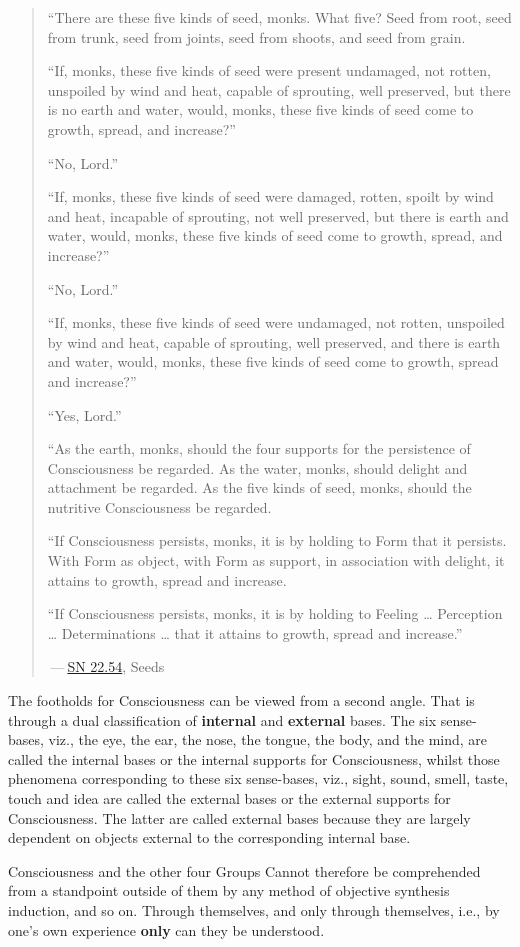 \begin{quote}
``There are these five kinds of seed, monks. What five? Seed from root, seed from trunk, seed from joints, seed from shoots, and seed from grain.

``If, monks, these five kinds of seed were present undamaged, not rotten, unspoiled by wind and heat, capable of sprouting, well preserved, but there is no earth and water, would, monks, these five kinds of seed come to growth, spread, and increase?''

``No, Lord.''

``If, monks, these five kinds of seed were damaged, rotten, spoilt by wind and heat, incapable of sprouting, not well preserved, but there is earth and water, would, monks, these five kinds of seed come to growth, spread, and increase?''

``No, Lord.''

``If, monks, these five kinds of seed were undamaged, not rotten, unspoiled by wind and heat, capable of sprouting, well preserved, and there is earth and water, would, monks, these five kinds of seed come to growth, spread and increase?''

``Yes, Lord.''

``As the earth, monks, should the four supports for the persistence of Consciousness be regarded. As the water, monks, should delight and attachment be regarded. As the five kinds of seed, monks, should the nutritive Consciousness be regarded.

``If Consciousness persists, monks, it is by holding to Form that it persists. With Form as object, with Form as support, in association with delight, it attains to growth, spread and increase.

``If Consciousness persists, monks, it is by holding to Feeling \ldots{} Perception \ldots{} Determinations \ldots{} that it attains to growth, spread and increase.''

 --- \href{https://suttacentral.net/sn22.54/en/bodhi}{SN 22.54}, Seeds
\end{quote}

The footholds for Consciousness can be viewed from a second angle. That is through a dual classification of \textbf{internal} and \textbf{external} bases. The six sense-bases, viz., the eye, the ear, the nose, the tongue, the body, and the mind, are called the internal bases or the internal supports for Consciousness, whilst those phenomena corresponding to these six sense-bases, viz., sight, sound, smell, taste, touch and idea are called the external bases or the external supports for Consciousness. The latter are called external bases because they are largely dependent on objects external to the corresponding internal base.

Consciousness and the other four Groups Cannot therefore be comprehended from a standpoint outside of them by any method of objective synthesis induction, and so on. Through themselves, and only through themselves, i.e., by one's own experience \textbf{only} can they be understood.
